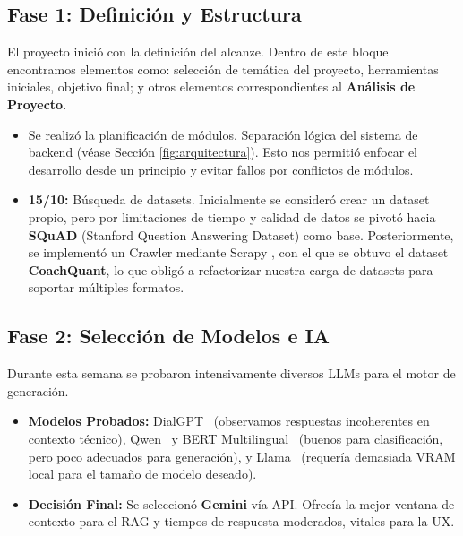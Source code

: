 \documentclass[12pt, a4paper]{article}
\begin{document}
\subsection{Fase 1: Definición y Estructura}
El proyecto inició con la definición del alcanze. Dentro de este bloque encontramos elementos como: selección de temática del proyecto, herramientas iniciales, objetivo final; y otros elementos correspondientes al \textbf{Análisis de Proyecto}.
\begin{itemize}
    \item Se realizó la planificación de módulos. Separación lógica del sistema de backend (véase Sección \ref{fig:arquitectura}). Esto nos permitió enfocar el desarrollo desde un principio y evitar fallos por conflictos de módulos. 
    \item \textbf{15/10:} Búsqueda de datasets. Inicialmente se consideró crear un dataset propio, pero por limitaciones de tiempo y calidad de datos se pivotó hacia \textbf{SQuAD} (Stanford Question Answering Dataset) \cite{squad} como base. Posteriormente, se implementó un Crawler mediante Scrapy \cite{scrapy2024}, con el que se obtuvo el dataset \textbf{CoachQuant}\cite{coachquant2025}, lo que obligó a refactorizar nuestra carga de datasets para soportar múltiples formatos.
\end{itemize}

\subsection{Fase 2: Selección de Modelos e IA}
Durante esta semana se probaron intensivamente diversos LLMs para el motor de generación.
\begin{itemize}
    \item \textbf{Modelos Probados:} DialGPT~\cite{dialogpt2020} (observamos respuestas incoherentes en contexto técnico), Qwen~\cite{qwen2023} y BERT Multilingual~\cite{mbert2019} (buenos para clasificación, pero poco adecuados para generación), y Llama~\cite{llama_requirements} (requería demasiada VRAM local para el tamaño de modelo deseado).

    \item \textbf{Decisión Final:} Se seleccionó \textbf{Gemini} \cite{gemini2023} vía API. Ofrecía la mejor ventana de contexto para el RAG y tiempos de respuesta moderados, vitales para la UX.
\end{itemize}
\end{document}
